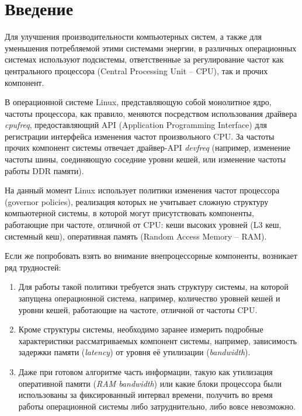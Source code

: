 \section{Введение}
\label{sec:Section0} 

    Для улучшения производительности компьютерных систем, а также для уменьшения потребляемой
    этими системами энергии, в различных операционных системах используют подсистемы,
    ответственные за регулирование частот как центрального процессора (Central Processing Unit -- CPU),
    так и прочих компонент.

    В операционной системе Linux, представляющую собой монолитное ядро, частоты процессора,
    как правило, меняются посредством использования драйвера \textit{cpufreq}, предоставляющий
    API (Application Programming Interface) для регистрации интерфейса изменения частот произвольного
    CPU. За частоты прочих компонент системы отвечает драйвер-API \textit{devfreq}
    (например, изменение частоты шины, соединяющую соседние уровни кешей, или изменение частоты
    работы DDR памяти).

    На данный момент Linux использует политики изменения частот процессора (governor policies),
    реализация которых не учитывает сложную структуру компьютерной системы, в которой могут
    присутствовать компоненты, работающие при частоте, отличной от CPU: кеши высоких уровней
    (L3 кеш, системный кеш), оперативная память (Random Access Memory -- RAM).

    Если же попробовать взять во внимание внепроцессорные компоненты, возникает ряд трудностей:
    \begin{enumerate}
        \item Для работы такой политики требуется знать структуру системы, на которой
        запущена операционной система, например, количество уровней кешей и уровни кешей, работающие
        на частоте, отличной от частоты CPU.
        \item Кроме структуры системы, необходимо заранее измерить подробные характеристики
        рассматриваемых компонент системы, например, зависимость задержки памяти (\textit{latency})
        от уровня её утилизации (\textit{bandwidth}).
        \item Даже при готовом алгоритме часть информации, такую как утилизация оперативной памяти
        (\textit{RAM bandwidth}) или какие блоки процессора были использованы за фиксированный
        интервал времени, получить во время работы операционной системы либо затруднительно,
        либо вовсе невозможно.
    \end{enumerate}

